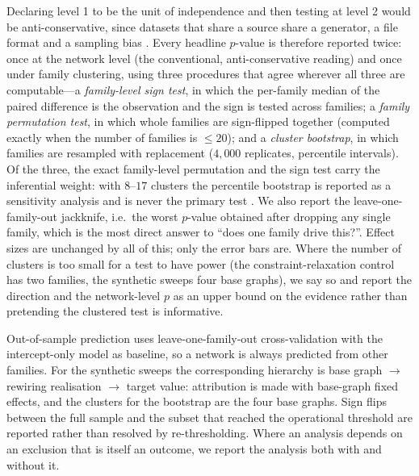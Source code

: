 \documentclass[11pt]{article}
\begin{document}
Declaring level 1 to be the unit of independence and then testing at level 2
would be anti-conservative, since datasets that share a source share a
generator, a file format and a sampling bias
\cite{CameronGelbachMiller2008,MacKinnonNielsenWebb2023}. Every headline
$p$-value is therefore reported twice: once at the network level (the
conventional, anti-conservative reading) and once under family clustering,
using three procedures that agree wherever all three are computable---a
\emph{family-level sign test}, in which the per-family median of the paired
difference is the observation and the sign is tested across families; a
\emph{family permutation test}, in which whole families are sign-flipped
together (computed exactly when the number of families is $\le 20$); and a
\emph{cluster bootstrap}, in which families are resampled with replacement
($4{,}000$ replicates, percentile intervals). Of the three, the exact
family-level permutation and the sign test carry the inferential weight: with
$8$--$17$ clusters the percentile bootstrap is reported as a sensitivity
analysis and is never the primary test
\cite{CameronGelbachMiller2008,MacKinnonNielsenWebb2023}. We also report the
leave-one-family-out jackknife, i.e.\ the worst $p$-value obtained after
dropping any single family, which is the most direct answer to ``does one
family drive this?''. Effect sizes are unchanged by all of this; only the
error bars are. Where the number of clusters is too small for a test to have
power (the constraint-relaxation control has two families, the synthetic
sweeps four base graphs), we say so and report the direction and the
network-level $p$ as an upper bound on the evidence rather than pretending the
clustered test is informative.

Out-of-sample prediction uses leave-one-family-out cross-validation with the
intercept-only model as baseline, so a network is always predicted from other
families. For the synthetic sweeps the corresponding hierarchy is
base graph $\to$ rewiring realisation $\to$ target value: attribution is made
with base-graph fixed effects, and the clusters for the bootstrap are the four
base graphs. Sign flips between the full sample
and the subset that reached the operational threshold are reported rather
than resolved by re-thresholding.
Where an analysis depends on an exclusion that is itself an outcome, we report
the analysis both with and without it.
\end{document}
